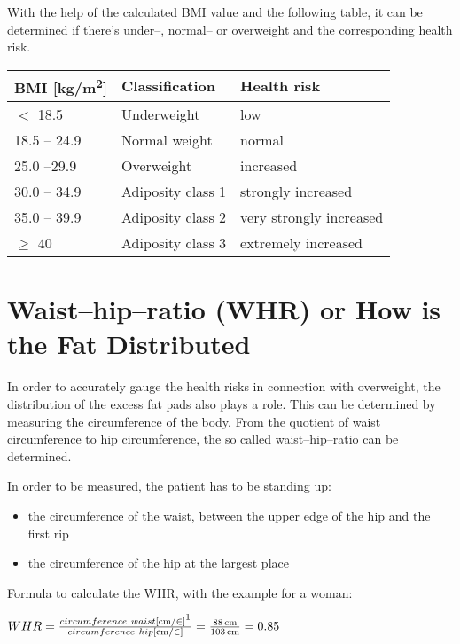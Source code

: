 \documentclass[../main.tex]{subfiles}
\begin{document}
With the help of the calculated BMI value and the following table, it can be determined if there's under--, normal-- or overweight and the corresponding health risk.

\begin{table}[htb!]
  \centering
  \begin{tabular}{lll}
    \textbf{BMI [\unit{\kg/\m^2}]} & \textbf{Classification} & \textbf{Health risk} \\
    \hline
    $<$ 18.5 & Underweight & low \\
    18.5 -- 24.9 & Normal weight & normal \\
    25.0 --29.9 & Overweight & increased \\
    30.0 -- 34.9 & Adiposity class 1 & strongly increased \\
    35.0 -- 39.9 & Adiposity class 2 & very strongly increased \\
    $\geq$ 40 & Adiposity class 3 & extremely  increased \\
  \end{tabular}
\end{table}

\section[Waist--hip--ratio (WHR)]{Waist--hip--ratio (WHR) or How is the Fat Distributed}
In order to accurately gauge the health risks in connection with overweight, the distribution of the excess fat pads also plays a role.
This can be determined by measuring the circumference of the body.
From the quotient of waist circumference to hip circumference, the so called waist--hip--ratio can be determined.


In order to be measured, the patient has to be standing up:
\begin{itemize}
\item the circumference of the waist, between the upper edge of the hip and the first rip
  \item the circumference of the hip at the largest place
  \end{itemize}

  Formula to calculate the WHR, with the example for a woman:

  \vspace{2mm}

\begin{center}
\begin{fminipage}{8cm}
  $WHR = \frac{circumference\ waist [\unit{\cm/\in}]\footnote{As the WHR is a ratio of measures,
    it doesn't matter in which unit the circumferences are measured, as long as it's in the same units for both of them.}}{circumference\ hip
    [\unit{\cm/\in}]} = \frac{\SI{88}{\cm}}{\SI{103}{\cm}} = 0.85$
\end{fminipage}
\end{center}
\end{document}

